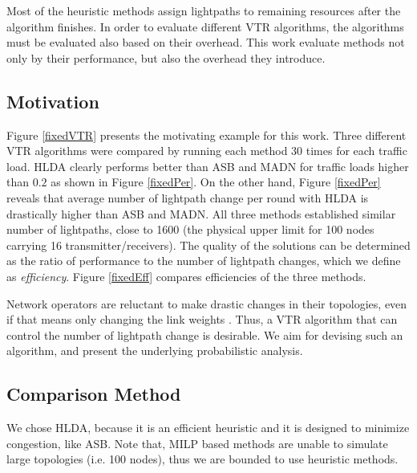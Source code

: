 \documentclass[conference]{IEEEtran}
\begin{document}
 Most of the heuristic methods assign lightpaths to remaining resources
 after the algorithm finishes.
In order to evaluate different VTR algorithms, the algorithms must be evaluated also based on their overhead.
This work evaluate methods not only by their performance, but also the overhead they introduce. 

 \subsection{Motivation}
Figure \ref{fixedVTR} presents the motivating example for this work. 
Three different VTR algorithms were compared by running each method 30 times for each traffic load.
 HLDA clearly performs better than  ASB and  MADN
 for traffic loads higher than $0.2$ as shown in Figure \ref{fixedPer}.
 On the other hand, Figure \ref{fixedPer} reveals that average number of lightpath change 
 per round with HLDA is drastically higher than ASB and MADN. 
 All three methods  established similar number of lightpaths, close to 1600 (the physical upper limit for 100 nodes carrying 16 transmitter/receivers).
 The quality of the solutions can be determined as the ratio of performance  to the number of lightpath changes, which we define as {\em efficiency}.
 Figure \ref{fixedEff} compares efficiencies of the three methods.
 
 Network operators are reluctant to make drastic  changes in their topologies, even if that means only changing the link weights \cite{Fortz:OOW02}.
 Thus, a VTR algorithm that can control the number of lightpath change is desirable. We aim for devising such an algorithm, and present the underlying probabilistic analysis.
 
 \begin{figure*}[th]
\centering
\def\mywidth{0.29}
  \hfil
    \hfil {} 
\caption{ The performance comparison of various VTR algorithms.}
   \label{fixedVTR}
 \end{figure*} 
 
\subsection{Comparison Method}
We chose HLDA, because it is an efficient heuristic and it is designed to minimize congestion, like ASB.
Note that, MILP based methods are unable to simulate large topologies (i.e. 100 nodes), thus we are bounded to use heuristic
methods.
\end{document}
